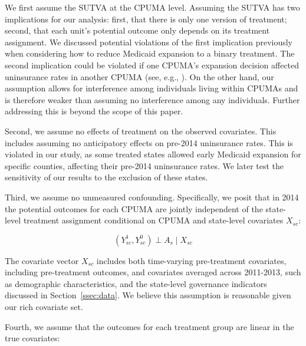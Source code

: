 \documentclass[aoas]{imsart}
\theoremstyle{plain}
\theoremstyle{remark}
\begin{document}
We first assume the SUTVA at the CPUMA level. Assuming the SUTVA has two implications for our analysis: first, that there is only one version of treatment; second, that each unit's potential outcome only depends on its treatment assignment. We discussed potential violations of the first implication previously when considering how to reduce Medicaid expansion to a binary treatment. The second implication could be violated if one CPUMA's expansion decision affected uninsurance rates in another CPUMA (see, e.g., \cite{frean2017premium}). On the other hand, our assumption allows for interference among individuals living within CPUMAs and is therefore weaker than assuming no interference among any individuals. Further addressing this is beyond the scope of this paper.

Second, we assume no effects of treatment on the observed covariates. This includes assuming no anticipatory effects on pre-2014 uninsurance rates. This is violated in our study, as some treated states allowed early Medicaid expansion for specific counties, affecting their pre-2014 uninsurance rates. We later test the sensitivity of our results to the exclusion of these states.

Third, we assume no unmeasured confounding. Specifically, we posit that in 2014 the potential outcomes for each CPUMA are jointly independent of the state-level treatment assignment conditional on CPUMA and state-level covariates $X_{sc}$:

\begin{equation}\label{eqn:unconfoundedness}
(Y_{sc}^1, Y_{sc}^0) \perp A_s \mid X_{sc} 
\end{equation}

The covariate vector $X_{sc}$ includes both time-varying pre-treatment covariates, including pre-treatment outcomes, and covariates averaged across 2011-2013, such as demographic characteristics, and the state-level governance indicators discussed in Section~\ref{ssec:data}. We believe this assumption is reasonable given our rich covariate set. 

Fourth, we assume that the outcomes for each treatment group are linear in the true covariates:
\end{document}
